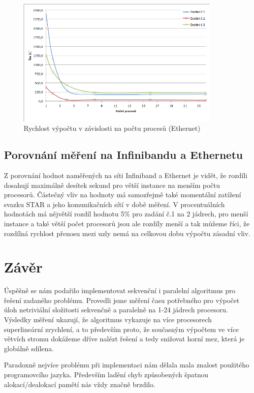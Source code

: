 \documentclass[12pt]{article}
\begin{document}
\begin{figure}[h]
\begin{center}
\includegraphics[width=100mm]{cpu_time_ethernet.png}
\caption{Rychlost výpočtu v závislosti na počtu procesů (Ethernet)}
\label{fig:ct_inifini}
\end{center}
\end{figure}


\subsection{Porovnání měření na Infinibandu a Ethernetu}
Z porovnání hodnot naměřených na síti Infiniband a Ethernet je vidět, že rozdíli
dosahují maximálně desítek sekund pro větší instance na menším počtu procesorů.
Částečný vliv na hodnoty má samozřejmě také momentální zatížení svazku STAR a
jeho komunikačních sítí v době měření. V procentuálních hodnotách má nějvětší
rozdíl hodnotu 5\% pro zadání č.1 na 2 jádrech, pro menší instance a také větší
počet procesorů jsou ale rozdíly menší a tak můžeme říci, že rozdílná rychlost
přenosu mezi uzly nemá na celkovou dobu výpočtu zásadní vliv.

\section{Závěr}

Úspěšně se nám podařilo implementovat sekvenční i paralelní algoritmus pro
řešení zadaného problému. Provedli jsme měření času potřebného pro výpočet úloh
netriviální složitosti sekvenčně a paralelně na 1-24 jádrech procesoru. Výsledky
měření ukazují, že algoritmus vykazuje na více procesorech superlineární
zrychlení, a to především proto, že současným  výpočtem ve více větvích stromu
dokážeme dříve nalézt  řešení a tedy snižovat horní mez, která je
globálně sdílena. 

Paradoxně nejvíce problému při implementaci nám dělala mala znalost použitého
programovcího jazyka. Především ladění chyb způsobených špatnou
alokací/dealokací pamětí nás vždy značně brzdilo.
\end{document}
